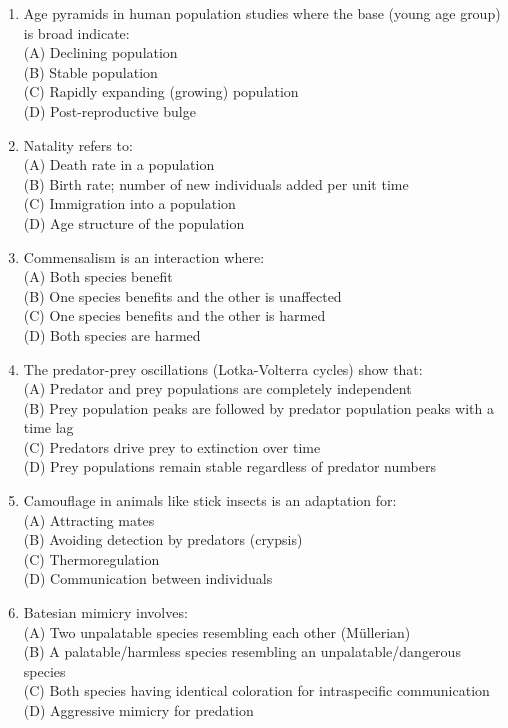 \documentclass{article}
\begin{document}
\begin{enumerate}[label=Q\arabic*.]
\item Age pyramids in human population studies where the base (young age group) is broad indicate:
\\(A) Declining population
\\(B) Stable population
\\(C) Rapidly expanding (growing) population
\\(D) Post-reproductive bulge

\item Natality refers to:
\\(A) Death rate in a population
\\(B) Birth rate; number of new individuals added per unit time
\\(C) Immigration into a population
\\(D) Age structure of the population

\item Commensalism is an interaction where:
\\(A) Both species benefit
\\(B) One species benefits and the other is unaffected
\\(C) One species benefits and the other is harmed
\\(D) Both species are harmed

\item The predator-prey oscillations (Lotka-Volterra cycles) show that:
\\(A) Predator and prey populations are completely independent
\\(B) Prey population peaks are followed by predator population peaks with a time lag
\\(C) Predators drive prey to extinction over time
\\(D) Prey populations remain stable regardless of predator numbers

\item Camouflage in animals like stick insects is an adaptation for:
\\(A) Attracting mates
\\(B) Avoiding detection by predators (crypsis)
\\(C) Thermoregulation
\\(D) Communication between individuals

\item Batesian mimicry involves:
\\(A) Two unpalatable species resembling each other (Müllerian)
\\(B) A palatable/harmless species resembling an unpalatable/dangerous species
\\(C) Both species having identical coloration for intraspecific communication
\\(D) Aggressive mimicry for predation


\end{enumerate}
\end{document}

